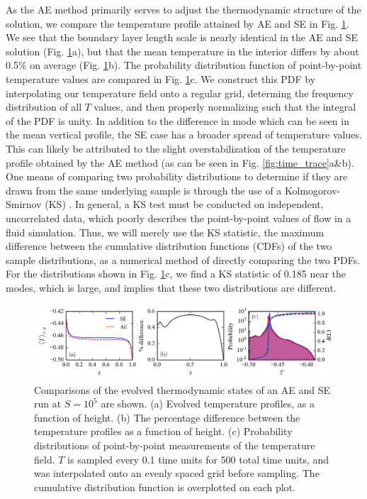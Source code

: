 \documentclass[aps, pre, onecolumn, nofootinbib, notitlepage, groupedaddress, amsfonts, amssymb, amsmath, longbibliography]{revtex4-1}
\begin{document}
As the AE method primarily serves to adjust the thermodynamic structure of the
solution, we compare the temperature profile attained by AE and SE in 
Fig. \ref{fig:temp_comparison}.  We see that the boundary layer length scale is 
nearly identical in the AE and SE solution (Fig. \ref{fig:temp_comparison}a), but that
the mean temperature in the interior differs by about 0.5\% on average
(Fig. \ref{fig:temp_comparison}b). The probability distribution function of point-by-point
temperature values are compared in Fig. \ref{fig:temp_comparison}c.  We construct
this PDF by interpolating our temperature field onto a regular grid, determing the
frequency distribution of all $T$ values, and then properly normalizing such that
the integral of the PDF is unity.  In addition to the
difference in mode which can be seen in the mean vertical profile, the SE case
has a broader spread of temperature values.  This can likely be attributed to the
slight overstabilization of the temperature profile obtained by the AE method
(as can be seen in Fig. \ref{fig:time_trace}a\&b).  One means of comparing two
probability distributions to determine if they are drawn from the same underlying
sample is through the use of a Kolmogorov-Smirnov (KS) \cite{wall&jenkins2012}.
In general, a KS test must be conducted on independent, uncorrelated data, which
poorly describes the point-by-point values of flow in a fluid simulation. Thus,
we will merely use the KS statistic, the maximum difference
between the cumulative distribution functions (CDFs) of the two sample distributions,
as a numerical method of directly comparing the two PDFs.  For the distributions
shown in Fig. \ref{fig:temp_comparison}c,
we find a KS statistic of 0.185 near the modes, which is large, and implies that
these two distributions are different.




\begin{figure}[t]
\includegraphics[width=\textwidth]{./figs/temp_comparison.png}
\caption{Comparisons of the evolved thermodynamic states of an AE and SE run
at $S = 10^{5}$ are shown.  (a) Evolved temperature profiles, as a function of height.
(b) The percentage difference between the temperature profiles as a function of height.
(c) Probability distributions of point-by-point measurements of the temperature field.
$T$ is sampled every 0.1 time units for 500 total time units,
and was interpolated onto an evenly spaced grid before sampling.
The cumulative distribution function is overplotted on each plot. 
\label{fig:temp_comparison} }
\end{figure}
\end{document}

